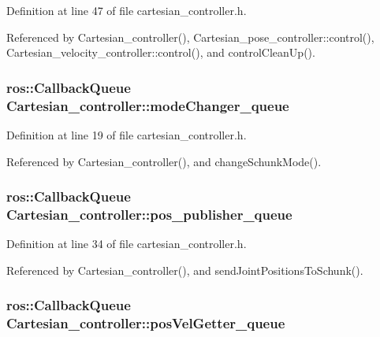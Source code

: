 Definition at line 47 of file cartesian\-\_\-controller.\-h.



Referenced by Cartesian\-\_\-controller(), Cartesian\-\_\-pose\-\_\-controller\-::control(), Cartesian\-\_\-velocity\-\_\-controller\-::control(), and control\-Clean\-Up().

\hypertarget{classCartesian__controller_adf47dc3a09bd9650015b25870054b60d}{
\subsubsection[{mode\-Changer\-\_\-queue}]{\setlength{\rightskip}{0pt plus 5cm}ros\-::\-Callback\-Queue Cartesian\-\_\-controller\-::mode\-Changer\-\_\-queue\hspace{0.3cm}{\ttfamily [protected]}}}\label{classCartesian__controller_adf47dc3a09bd9650015b25870054b60d}


Definition at line 19 of file cartesian\-\_\-controller.\-h.



Referenced by Cartesian\-\_\-controller(), and change\-Schunk\-Mode().

\hypertarget{classCartesian__controller_adbb9cddf4092cba9042294740c5371eb}{
\subsubsection[{pos\-\_\-publisher\-\_\-queue}]{\setlength{\rightskip}{0pt plus 5cm}ros\-::\-Callback\-Queue Cartesian\-\_\-controller\-::pos\-\_\-publisher\-\_\-queue\hspace{0.3cm}{\ttfamily [protected]}}}\label{classCartesian__controller_adbb9cddf4092cba9042294740c5371eb}


Definition at line 34 of file cartesian\-\_\-controller.\-h.



Referenced by Cartesian\-\_\-controller(), and send\-Joint\-Positions\-To\-Schunk().

\hypertarget{classCartesian__controller_a144c7faad45f3d070624452c1f02ba15}{
\subsubsection[{pos\-Vel\-Getter\-\_\-queue}]{\setlength{\rightskip}{0pt plus 5cm}ros\-::\-Callback\-Queue Cartesian\-\_\-controller\-::pos\-Vel\-Getter\-\_\-queue\hspace{0.3cm}{\ttfamily [protected]}}}\label{classCartesian__controller_a144c7faad45f3d070624452c1f02ba15}



